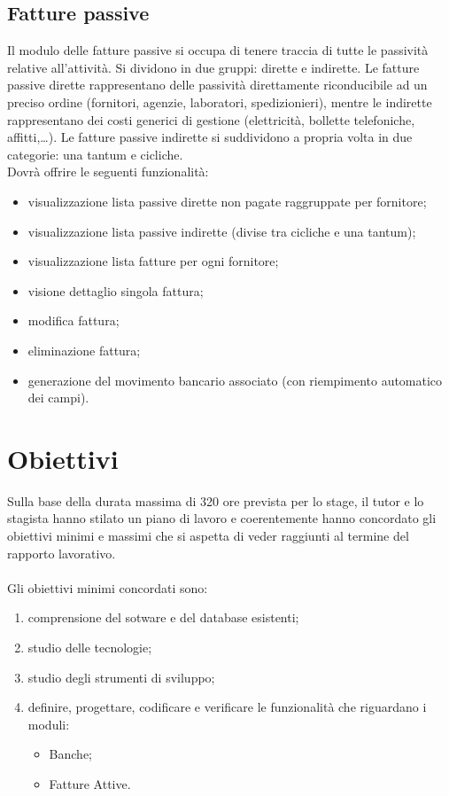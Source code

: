 	\subsection{Fatture passive}
	\label{mod:fp}
	Il modulo delle fatture passive si occupa di tenere traccia di tutte le passività relative
	all’attività. Si dividono in due gruppi: dirette e indirette. Le fatture passive dirette rappresentano
	delle passività direttamente riconducibile ad un preciso ordine (fornitori, agenzie, laboratori,
	spedizionieri), mentre le indirette rappresentano dei costi generici di gestione (elettricità,
	bollette telefoniche, affitti,…). Le fatture passive indirette si suddividono a propria volta in
	due categorie: una tantum e cicliche. \\
	Dovrà offrire le seguenti funzionalità:
	\begin{itemize}
		\item visualizzazione lista passive dirette non pagate raggruppate per fornitore;
		\item visualizzazione lista passive indirette (divise tra cicliche e una tantum);
		\item visualizzazione lista fatture per ogni fornitore;
		\item visione dettaglio singola fattura;
		\item modifica fattura;
		\item eliminazione fattura;
		\item generazione del movimento bancario associato (con riempimento automatico dei campi).
	\end{itemize}	

\section{Obiettivi}
Sulla base della durata massima di 320 ore prevista per lo stage, il tutor e lo stagista hanno
stilato un piano di lavoro e coerentemente hanno concordato gli obiettivi minimi e massimi che si aspetta di veder raggiunti al termine del rapporto lavorativo.
\\ \\
Gli obiettivi minimi concordati sono:
\begin{enumerate}
	\item comprensione del sotware e del database esistenti;
	\item studio delle tecnologie;
	\item studio degli strumenti di sviluppo;
	\item definire, progettare, codificare e verificare le funzionalità che riguardano i moduli:
		\begin{itemize}
			\item Banche;
			\item Fatture Attive.
		\end{itemize}
\end{enumerate}

